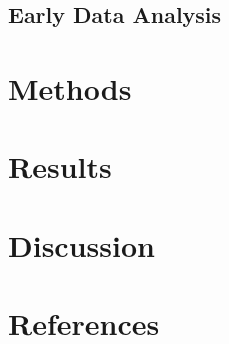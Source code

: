 \documentclass[]{article}
\begin{document}
\hypertarget{sec:eda}{\subsection{Early Data Analysis}\label{sec:eda}}

\hypertarget{sec:methods}{\section{Methods}\label{sec:methods}}

\hypertarget{sec:results}{\section{Results}\label{sec:results}}

\section{Discussion}\label{sec:discussion}

\section{References}\label{sec:refs}
\end{document}
